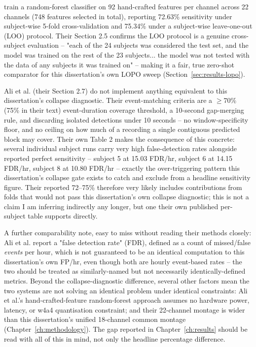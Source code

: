 \citet{ali2024} train a random-forest classifier on 92 hand-crafted features per channel across 22 channels (748 features selected in total), reporting 72.63\% sensitivity under subject-wise 5-fold cross-validation and 75.34\% under a subject-wise leave-one-out (LOO) protocol. Their Section 2.5 confirms the LOO protocol is a genuine cross-subject evaluation -- "each of the 24 subjects was considered the test set, and the model was trained on the rest of the 23 subjects... the model was not tested with the data of any subjects it was trained on" -- making it a fair, true zero-shot comparator for this dissertation's own LOPO sweep (Section~\ref{sec:results-lopo}).


Ali et al. (their Section 2.7) do not implement anything equivalent to this dissertation's collapse diagnostic. Their event-matching criteria are a $\geq$70\% (75\% in their text) event-duration coverage threshold, a 10-second gap-merging rule, and discarding isolated detections under 10 seconds -- no window-specificity floor, and no ceiling on how much of a recording a single contiguous predicted block may cover. Their own Table 2 makes the consequence of this concrete: several individual subject runs carry very high false-detection rates alongside reported perfect sensitivity -- subject 5 at 15.03 FDR/hr, subject 6 at 14.15 FDR/hr, subject 8 at 10.80 FDR/hr -- exactly the over-triggering pattern this dissertation's collapse gate exists to catch and exclude from a headline sensitivity figure. Their reported 72--75\% therefore very likely includes contributions from folds that would not pass this dissertation's own collapse diagnostic; this is not a claim I am inferring indirectly any longer, but one their own published per-subject table supports directly.


A further comparability note, easy to miss without reading their methods closely: Ali et al. report a "false detection rate" (FDR), defined as a count of missed/false \emph{events} per hour, which is not guaranteed to be an identical computation to this dissertation's own FP/hr, even though both are hourly event-based rates -- the two should be treated as similarly-named but not necessarily identically-defined metrics. Beyond the collapse-diagnostic difference, several other factors mean the two systems are not solving an identical problem under identical constraints: Ali et al.'s hand-crafted-feature random-forest approach assumes no hardware power, latency, or w4a4 quantisation constraint; and their 22-channel montage is wider than this dissertation's unified 18-channel common montage (Chapter~\ref{ch:methodology}). The gap reported in Chapter~\ref{ch:results} should be read with all of this in mind, not only the headline percentage difference.


